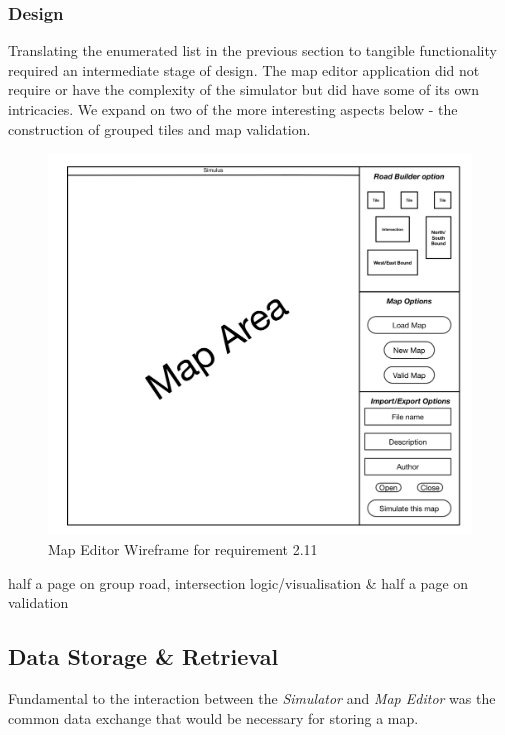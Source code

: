 \subsubsection{Design}
Translating the enumerated list in the previous section to tangible functionality required an intermediate stage of design.  The map editor application did not require or have the complexity of the simulator but did have some of its own intricacies. We expand on two of the more interesting aspects below - the construction of grouped tiles and map validation.

\begin{figure}[h]
	\begin{center}
		\includegraphics{img/Map_Editor_Wireframe.png}
		\caption{Map Editor Wireframe for requirement 2.11}
		\label{fig:editorwireframe}
	\end{center}
\end{figure}
\pagebreak

half a page on group road, intersection logic/visualisation \&
half a page on validation
\pagebreak

\subsection{Data Storage \& Retrieval}\label{ss:xml}
Fundamental to the interaction between the \textit{Simulator} and \textit{Map Editor} was the common data exchange that would be necessary for storing a map.

